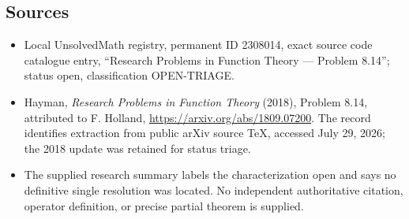 \documentclass[11pt]{article}
\begin{document}
\subsection{Sources}
\begin{itemize}
\item Local UnsolvedMath registry, permanent ID 2308014, exact source code catalogue entry, ``Research Problems in Function Theory --- Problem 8.14''; status open, classification OPEN-TRIAGE.
\item Hayman, \emph{Research Problems in Function Theory} (2018), Problem 8.14, attributed to F. Holland, \url{https://arxiv.org/abs/1809.07200}. The record identifies extraction from public arXiv source TeX, accessed July 29, 2026; the 2018 update was retained for status triage.
\item The supplied research summary labels the characterization open and says no definitive single resolution was located. No independent authoritative citation, operator definition, or precise partial theorem is supplied.
\end{itemize}
\end{document}
